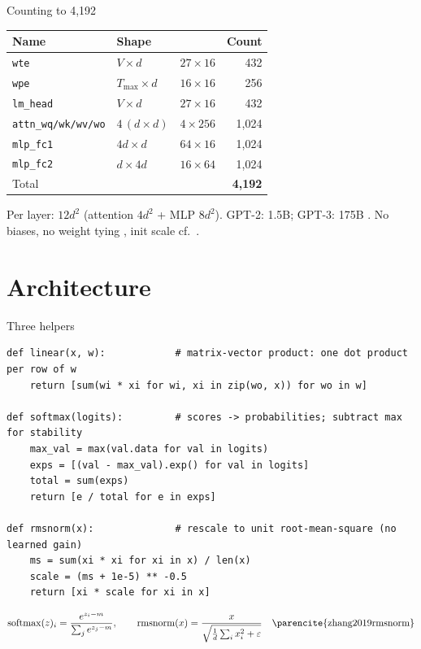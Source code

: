 \documentclass[aspectratio=169,11pt]{beamer}
\newcommand{\softmax}{\operatorname{softmax}}
\newcommand{\rmsnorm}{\operatorname{rmsnorm}}
\begin{document}
\begin{frame}{Counting to 4{,}192}
\centering
\begin{tabular}{@{}llrr@{}}
\toprule
Name & Shape & & Count \\
\midrule
\texttt{wte} & $V\times d$ & $27\times 16$ & 432 \\
\texttt{wpe} & $T_{\max}\times d$ & $16\times 16$ & 256 \\
\texttt{lm\_head} & $V\times d$ & $27\times 16$ & 432 \\
\texttt{attn\_wq/wk/wv/wo} & $4\,(d\times d)$ & $4\times 256$ & 1{,}024 \\
\texttt{mlp\_fc1} & $4d\times d$ & $64\times 16$ & 1{,}024 \\
\texttt{mlp\_fc2} & $d\times 4d$ & $16\times 64$ & 1{,}024 \\
\midrule
Total & & & \textbf{4{,}192} \\
\bottomrule
\end{tabular}
\vfill
Per layer: $12d^2$ (attention $4d^2$ + MLP $8d^2$). GPT-2: 1.5B; GPT-3: 175B \parencite{radford2019gpt2,brown2020gpt3}. No biases, no weight tying \parencite{press2017weighttying}, init scale cf.\ \textcite{glorot2010init}.
\end{frame}

\section{Architecture}
\begin{frame}[fragile]{Three helpers}
\begin{lstlisting}
def linear(x, w):            # matrix-vector product: one dot product per row of w
    return [sum(wi * xi for wi, xi in zip(wo, x)) for wo in w]

def softmax(logits):         # scores -> probabilities; subtract max for stability
    max_val = max(val.data for val in logits)
    exps = [(val - max_val).exp() for val in logits]
    total = sum(exps)
    return [e / total for e in exps]

def rmsnorm(x):              # rescale to unit root-mean-square (no learned gain)
    ms = sum(xi * xi for xi in x) / len(x)
    scale = (ms + 1e-5) ** -0.5
    return [xi * scale for xi in x]
\end{lstlisting}
\[
\softmax(z)_i = \frac{e^{z_i-m}}{\sum_j e^{z_j-m}},\qquad
\rmsnorm(x) = \frac{x}{\sqrt{\frac1d\sum_i x_i^2+\varepsilon}}\quad\text{\parencite{zhang2019rmsnorm}}
\]
\end{frame}
\end{document}

